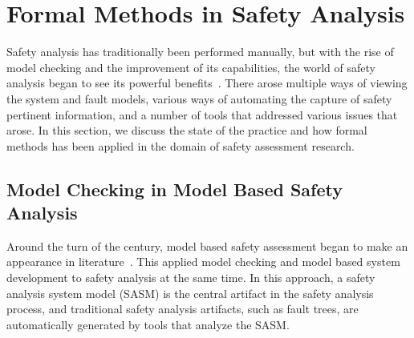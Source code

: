 \section{Formal Methods in Safety Analysis}
\label{sec:modelCheckingInSA}
Safety analysis has traditionally been performed manually, but with the rise of model checking and the improvement of its capabilities, the world of safety analysis began to see its powerful benefits~\cite{hinchey2012industrial, liggesmeyer1998improving, coudert1993fault, Bozzano:2010:DSA:1951720,bozzano2003esacs}. There arose multiple ways of viewing the system and fault models, various ways of automating the capture of safety pertinent information, and a number of tools that addressed various issues that arose. In this section, we discuss the state of the practice and how formal methods has been applied in the domain of safety assessment research.

\subsection{Model Checking in Model Based Safety Analysis}


Around the turn of the century, model based safety assessment began to make an appearance in literature~\cite{Bozzano:2010:DSA:1951720,Joshi05:Dasc, Joshi05:SafeComp, cimatti2000industrial,signoret1998altarica,chiappini1999formal}. This applied model checking and model based system development to safety analysis at the same time.  In this approach, a safety analysis system model (SASM) is the central artifact in the safety analysis process, and traditional safety analysis artifacts, such as fault trees, are automatically generated by tools that analyze the SASM.

